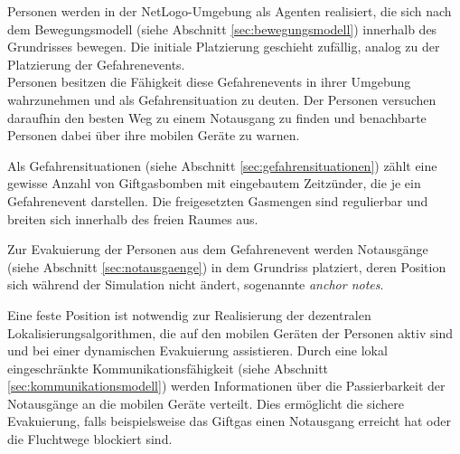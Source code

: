 Personen werden in der NetLogo-Umgebung als Agenten realisiert, die sich nach dem Bewegungsmodell (siehe Abschnitt \ref{sec:bewegungsmodell}) innerhalb des Grundrisses bewegen. Die initiale Platzierung geschieht zufällig, analog zu der Platzierung der Gefahrenevents.\\
Personen besitzen die Fähigkeit diese Gefahrenevents in ihrer Umgebung wahrzunehmen und als Gefahrensituation zu deuten. Der Personen versuchen daraufhin den besten Weg zu einem Notausgang zu finden und benachbarte Personen dabei über ihre mobilen Geräte zu warnen.

Als Gefahrensituationen (siehe Abschnitt \ref{sec:gefahrensituationen}) zählt eine gewisse Anzahl von Giftgasbomben mit eingebautem Zeitzünder, die je ein Gefahrenevent darstellen. Die freigesetzten Gasmengen sind regulierbar und breiten sich innerhalb des freien Raumes aus.

Zur Evakuierung der Personen aus dem Gefahrenevent werden Notausgänge (siehe Abschnitt \ref{sec:notausgaenge}) in dem Grundriss platziert, deren Position sich während der Simulation nicht ändert, sogenannte \emph{anchor notes}.

Eine feste Position ist notwendig zur Realisierung der dezentralen Lokalisierungsalgorithmen, die auf den mobilen Geräten der Personen aktiv sind und bei einer dynamischen Evakuierung assistieren. Durch eine lokal eingeschränkte Kommunikationsfähigkeit (siehe Abschnitt \ref{sec:kommunikationsmodell}) werden Informationen über die Passierbarkeit der Notausgänge an die mobilen Geräte verteilt. Dies ermöglicht die sichere Evakuierung, falls beispielsweise das Giftgas einen Notausgang erreicht hat oder die Fluchtwege blockiert sind.


